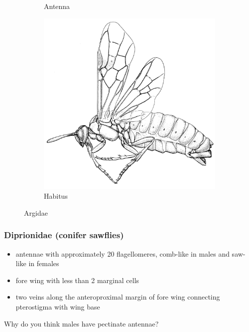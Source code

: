 \documentclass[letterpaper, 11pt]{article}
\begin{document}
\begin{figure}[ht!]
\begin{subfigure}[ht!]{0.11\textwidth}
        \caption{Antenna}
        \label{fig:argid1}
    \end{subfigure}
    \qquad
    \begin{subfigure}[ht!]{0.45\textwidth}
        \includegraphics[width=\textwidth]{ArgidHabitus}
        \caption{Habitus}
        \label{fig:argid2}
    \end{subfigure}
    \caption{Argidae \citep[][pg. 106 (a) and Fig. 26 (b)]{goulet1993hymenoptera}}\label{fig:argid}
\end{figure}

\subsubsection{Diprionidae (conifer sawflies)}
\begin{itemize}
\item antennae with approximately 20 flagellomeres, comb-like in males and saw-like in females
%
%
\item fore wing with less than 2 marginal cells
\item two veins along the anteroproximal margin of fore wing connecting pterostigma with wing base
\end{itemize}
\noindent{}Why do you think males have pectinate antennae?
\end{document}
